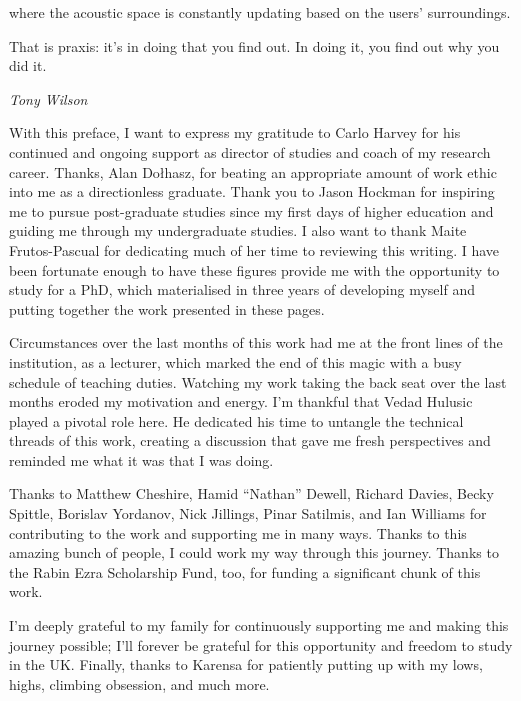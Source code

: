{where the acoustic space is constantly updating based on the users' surroundings.}
    
  \epigraph{That is praxis: it's in doing that you find out. In doing it, you find out why you did it.}{\textit{Tony Wilson}}

With this preface, I want to express my gratitude to Carlo Harvey for his continued and ongoing support as director of studies and coach of my research career. Thanks, Alan Do\l hasz, for beating an appropriate amount of work ethic into me as a directionless graduate. Thank you to Jason Hockman for inspiring me to pursue post-graduate studies since my first days of higher education and guiding me through my undergraduate studies. I also want to thank Maite Frutos-Pascual for dedicating much of her time to reviewing this writing. I have been fortunate enough to have these figures provide me with the opportunity to study for a PhD, which materialised in three years of developing myself and putting together the work presented in these pages.\par
Circumstances over the last months of this work had me at the front lines of the institution, as a lecturer, which marked the end of this magic with a busy schedule of teaching duties. Watching my work taking the back seat over the last months eroded my motivation and energy. I'm thankful that Vedad Hulusic played a pivotal role here. He dedicated his time to untangle the technical threads of this work, creating a discussion that gave me fresh perspectives and reminded me what it was that I was doing.\par
Thanks to Matthew Cheshire, Hamid ``Nathan'' Dewell, Richard Davies, Becky Spittle, Borislav Yordanov, Nick Jillings, Pinar Satilmis, and Ian Williams for contributing to the work and supporting me in many ways. Thanks to this amazing bunch of people, I could work my way through this journey. Thanks to the Rabin Ezra Scholarship Fund, too, for funding a significant chunk of this work.\par
I'm deeply grateful to my family for continuously supporting me and making this journey possible; I'll forever be grateful for this opportunity and freedom to study in the UK. Finally, thanks to Karensa for patiently putting up with my lows, highs, climbing obsession, and much more.
\afterpreface{} 
